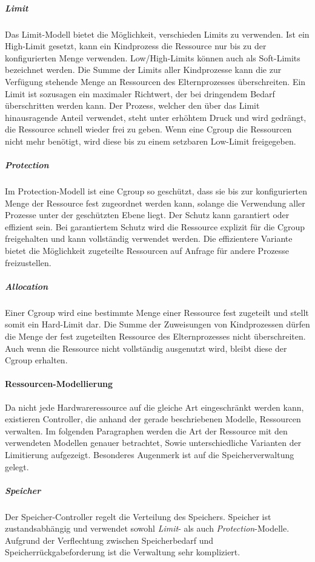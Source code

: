 \subparagraph{Limit}
Das Limit-Modell bietet die Möglichkeit, verschieden Limits zu verwenden. Ist ein High-Limit gesetzt, kann ein Kindprozess die Ressource nur bis zu der konfigurierten Menge verwenden. Low/High-Limits können auch als Soft-Limits bezeichnet werden. Die Summe der Limits aller Kindprozesse kann die zur Verfügung stehende Menge an Ressourcen des Elternprozesses überschreiten. Ein Limit ist sozusagen ein maximaler Richtwert, der bei dringendem Bedarf überschritten werden kann. Der Prozess, welcher den über das Limit hinausragende Anteil verwendet, steht unter erhöhtem Druck und wird gedrängt, die Ressource schnell wieder frei zu geben. Wenn eine Cgroup die Ressourcen nicht mehr benötigt, wird diese bis zu einem setzbaren Low-Limit freigegeben.


\subparagraph{Protection}
Im Protection-Modell ist eine Cgroup so geschützt, dass sie bis zur konfigurierten Menge der Ressource fest zugeordnet werden kann, solange die Verwendung aller Prozesse unter der geschützten Ebene liegt. Der Schutz kann garantiert oder effizient sein. Bei garantiertem Schutz wird die Ressource explizit für die Cgroup freigehalten und kann vollständig verwendet werden. Die effizientere Variante bietet die Möglichkeit zugeteilte Ressourcen auf Anfrage für andere Prozesse freizustellen.


\subparagraph{Allocation}
Einer Cgroup wird eine bestimmte Menge einer Ressource fest zugeteilt und stellt somit ein Hard-Limit dar. Die Summe der Zuweisungen von Kindprozessen dürfen die Menge der fest zugeteilten Ressource des Elternprozesses nicht überschreiten. Auch wenn die Ressource nicht vollständig ausgenutzt wird, bleibt diese der Cgroup erhalten. 


\paragraph{Ressourcen-Modellierung}
Da nicht jede Hardwareressource auf die gleiche Art eingeschränkt werden kann, existieren Controller, die anhand der gerade beschriebenen Modelle, Ressourcen verwalten. Im folgenden Paragraphen werden die Art der Ressource mit den verwendeten Modellen genauer betrachtet, Sowie unterschiedliche Varianten der Limitierung aufgezeigt. Besonderes Augenmerk ist auf die Speicherverwaltung gelegt.

\subparagraph{Speicher}
Der Speicher-Controller regelt die Verteilung des Speichers. Speicher ist zustandsabhängig und verwendet sowohl \emph{Limit}- als auch \emph{Protection}-Modelle. Aufgrund der Verflechtung zwischen Speicherbedarf und Speicherrückgabeforderung ist die Verwaltung sehr kompliziert.

